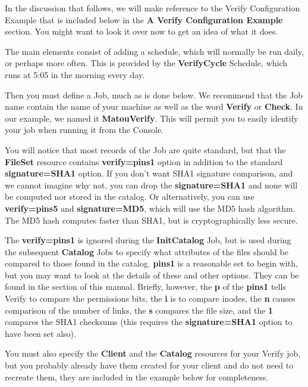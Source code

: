 In the discussion that follows, we will make reference to the Verify
Configuration Example that is included below in the {\bf A Verify
Configuration Example} section. You might want to look it over now to get an
idea of what it does.

The main elements consist of adding a schedule, which will normally be run
daily, or perhaps more often. This is provided by the {\bf VerifyCycle}
Schedule, which runs at 5:05 in the morning every day.

Then you must define a Job, much as is done below. We recommend that the Job
name contain the name of your machine as well as the word {\bf Verify} or {\bf
Check}. In our example, we named it {\bf MatouVerify}. This will permit you to
easily identify your job when running it from the Console.

You will notice that most records of the Job are quite standard, but that the
{\bf FileSet} resource contains {\bf verify=pins1} option in addition to the
standard {\bf signature=SHA1} option. If you don't want SHA1 signature
comparison, and we cannot imagine why not, you can drop the {\bf
signature=SHA1} and none will be computed nor stored in the catalog. Or
alternatively, you can use {\bf verify=pins5} and {\bf signature=MD5}, which
will use the MD5 hash algorithm. The MD5 hash computes faster than SHA1, but
is cryptographically less secure.

The {\bf verify=pins1} is ignored during the {\bf InitCatalog} Job, but is
used during the subsequent {\bf Catalog} Jobs to specify what attributes of
the files should be compared to those found in the catalog. {\bf pins1} is a
reasonable set to begin with, but you may want to look at the details of these
and other options. They can be found in the
 section of this manual.
Briefly, however, the {\bf p} of the {\bf pins1} tells Verify to compare the
permissions bits, the {\bf i} is to compare inodes, the {\bf n} causes
comparison of the number of links, the {\bf s} compares the file size, and the
{\bf 1} compares the SHA1 checksums (this requires the {\bf signature=SHA1}
option to have been set also).

You must also specify the {\bf Client} and the {\bf Catalog} resources for
your Verify job, but you probably already have them created for your client
and do not need to recreate them, they are included in the example below for
completeness.

